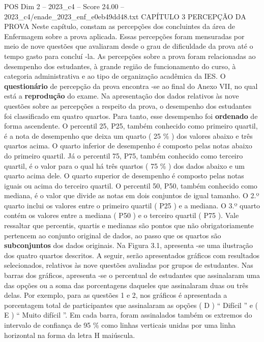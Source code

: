 \begin{textsample}{POS Dim 2 – 2023\_c4 – Score 24.00 – 2023\_c4/enade\_2023\_enf\_e0eb49dd48.txt}  \label{ex:f2_pos_013}
CAPÍTULO 3 PERCEPÇÃO DA PROVA Neste capítulo, constam as percepções dos concluintes da área de Enfermagem sobre a prova aplicada.
Essas percepções foram mensuradas por meio de nove questões que avaliaram desde o grau de dificuldade da prova até o tempo gasto para concluí -la.
As percepções sobre a prova foram relacionadas ao desempenho dos estudantes, à grande região de funcionamento do curso, à categoria administrativa e ao tipo de organização acadêmica da IES.
O \textbf{questionário} de percepção da prova encontra -se ao final do Anexo VII, no qual está a \textbf{reprodução} do exame.
Na apresentação dos dados relativos às nove questões sobre as percepções a respeito da prova, o desempenho dos estudantes foi classificado em quatro quartos.
Para tanto, esse desempenho foi \textbf{ordenado} de forma ascendente.
O percentil 25, P25, também conhecido como primeiro quartil, é a nota de desempenho que deixa um quarto ( 25 \% ) dos valores abaixo e três quartos acima.
O quarto inferior de desempenho é composto pelas notas abaixo do primeiro quartil.
Já o percentil 75, P75, também conhecido como terceiro quartil, é o valor para o qual há três quartos ( 75 \% ) dos dados abaixo e um quarto acima dele.
O quarto superior de desempenho é composto pelas notas iguais ou acima do terceiro quartil.
O percentil 50, P50, também conhecido como mediana, é o valor que divide as notas em dois conjuntos de igual tamanho.
O 2.º quarto inclui os valores entre o primeiro quartil ( P25 ) e a mediana.
O 3.º quarto contém os valores entre a mediana ( P50 ) e o terceiro quartil ( P75 ).
Vale ressaltar que percentis, quartis e medianas são pontos que não obrigatoriamente pertencem ao conjunto original de dados, ao passo que os quartos são \textbf{subconjuntos} dos dados originais.
Na Figura 3.1, apresenta -se uma ilustração dos quatro quartos descritos.
A seguir, serão apresentados gráficos com resultados selecionados, relativos às nove questões avaliadas por grupos de estudantes.
Nas barras dos gráficos, apresenta -se o percentual de estudantes que assinalaram uma das opções ou a soma das porcentagens daqueles que assinalaram duas ou três delas.
Por exemplo, para as questões 1 e 2, nos gráficos é apresentada a porcentagem total de participantes que assinalaram as opções ( D ) “ Difícil ” e ( E ) “ Muito difícil ”.
Em cada barra, foram assinalados também os extremos do intervalo de confiança de 95 \% como linhas verticais unidas por uma linha horizontal na forma da letra H maiúscula.

\end{textsample}
